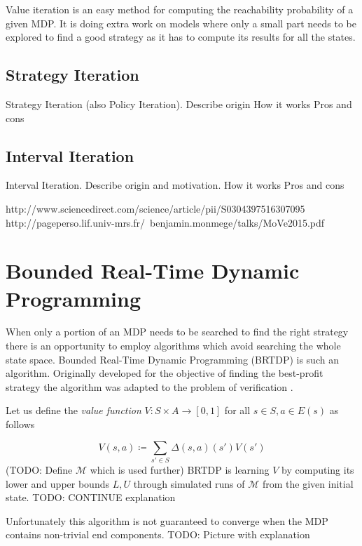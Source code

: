 Value iteration is an easy method for computing the reachability
probability of a given MDP. It is doing extra work on models where only
a small part needs to be explored to find a good strategy as it has to
compute its results for all the states.

\subsection{Strategy Iteration}
Strategy Iteration (also Policy Iteration).
Describe origin
How it works
Pros and cons

\subsection{Interval Iteration}
Interval Iteration.
Describe origin and motivation.
How it works
Pros and cons

http://www.sciencedirect.com/science/article/pii/S0304397516307095
http://pageperso.lif.univ-mrs.fr/~benjamin.monmege/talks/MoVe2015.pdf

\section{Bounded Real-Time Dynamic Programming}

When only a portion of an MDP needs to be searched to find the right
strategy there is an opportunity to employ algorithms which avoid
searching the whole state space. Bounded Real-Time Dynamic Programming
(BRTDP) is such an algorithm. Originally developed for
the objective of finding the best-profit strategy
\parencite{profit_brtdp} the algorithm was adapted to the problem of
verification \parencite{atva14}.

Let us define the {\em value function} $V : S \times A \to
[0,1]$ for all $s \in S, a \in E(s)$ as follows

\[
    V(s,a) \coloneqq \sum_{s' \in S} \Delta(s,a)(s')V(s')
\]
(TODO: Define $\mathcal{M}$ which is used further)
BRTDP is learning $V$ by computing its lower and upper bounds $L, U$
through simulated runs of $\mathcal{M}$ from the given initial state.
TODO: CONTINUE explanation

Unfortunately this algorithm is not guaranteed to converge when the MDP
contains non-trivial end components. TODO: Picture with explanation

